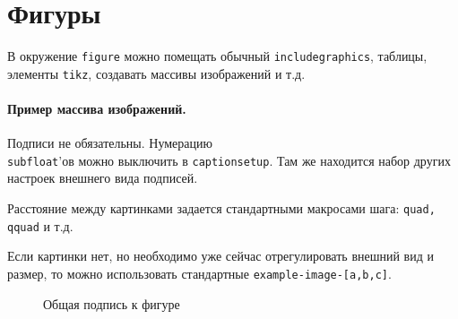 
\section{Фигуры}
В окружение \texttt{figure} можно помещать обычный \texttt{includegraphics}, таблицы, элементы \texttt{tikz}, создавать массивы изображений и т.д.

\paragraph{Пример массива изображений.}
Подписи не обязательны. Нумерацию \\ \texttt{subfloat}'ов можно выключить в \texttt{captionsetup}. Там же находится набор других настроек внешнего вида подписей.

Расстояние между картинками задается стандартными макросами шага: \texttt{quad, qquad} и т.д.

Если картинки нет, но необходимо уже сейчас отрегулировать внешний вид и размер, то можно использовать стандартные \texttt{example-image-[a,b,c]}.

\begin{figure}[H]
    \centering
    \captionsetup[subfigure]{justification=centering}
    \quad
    \quad
    \quad
    \caption{Общая подпись к фигуре}
\end{figure}
